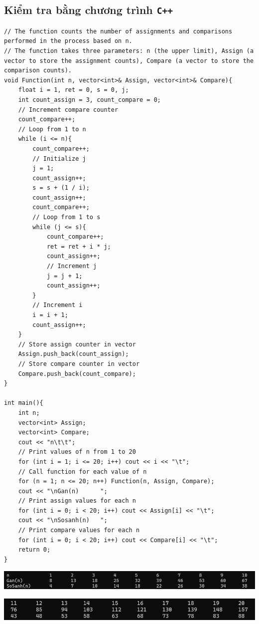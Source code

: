\documentclass[12pt, a4paper]{article}
\begin{document}
\subsection{Kiểm tra bằng chương trình \texttt{C++}}
\begin{lstlisting}
// The function counts the number of assignments and comparisons performed in the process based on n.
// The function takes three parameters: n (the upper limit), Assign (a vector to store the assignment counts), Compare (a vector to store the comparison counts).
void Function(int n, vector<int>& Assign, vector<int>& Compare){
    float i = 1, ret = 0, s = 0, j;
    int count_assign = 3, count_compare = 0;
    // Increment compare counter
    count_compare++;
    // Loop from 1 to n
    while (i <= n){ 
        count_compare++;
        // Initialize j
        j = 1; 
        count_assign++;
        s = s + (1 / i);
        count_assign++;
        count_compare++;
        // Loop from 1 to s
        while (j <= s){ 
            count_compare++;
            ret = ret + i * j;
            count_assign++;
            // Increment j
            j = j + 1; 
            count_assign++;
        }
        // Increment i
        i = i + 1; 
        count_assign++;
    }
    // Store assign counter in vector
    Assign.push_back(count_assign);
    // Store compare counter in vector
    Compare.push_back(count_compare); 
}

int main(){
    int n;
    vector<int> Assign;
    vector<int> Compare;
    cout << "n\t\t";
    // Print values of n from 1 to 20
    for (int i = 1; i <= 20; i++) cout << i << "\t";
    // Call function for each value of n
    for (n = 1; n <= 20; n++) Function(n, Assign, Compare); 
    cout << "\nGan(n)      ";
    // Print assign values for each n
    for (int i = 0; i < 20; i++) cout << Assign[i] << "\t"; 
    cout << "\nSosanh(n)   ";
    // Print compare values for each n
    for (int i = 0; i < 20; i++) cout << Compare[i] << "\t"; 
    return 0;
}
\end{lstlisting}
\begin{center}
\includegraphics[width=1\textwidth]{img/terminal11a.png}
\end{center}
\begin{center}
\includegraphics[width=1\textwidth]{img/terminal11b.png}
\end{center}
\end{document}
